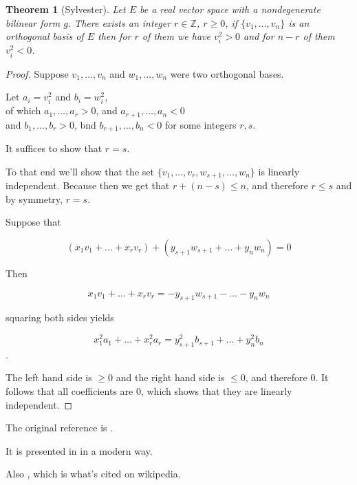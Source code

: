 \documentclass{amsbook}
\newtheorem{theorem}{Theorem}[section]   %
\theoremstyle{definition}
\theoremstyle{remark}
\newcommand{\Z}{\mathopen{}\ensuremath{\mathbb{Z}}\mathclose{}}
\begin{document}
\begin{theorem}[Sylvester]
  Let $E$ be a real vector space with a nondegenerate bilinear form $g$.
  There exists an integer $r\in \Z$, $r \geq 0$, if $\{v_1,\dots,v_n\}$ is an
  orthogonal basis of $E$ then for $r$ of them we have $v_i^2 > 0$ and for
  $n-r$ of them $v_i^2 < 0$.
\end{theorem}

\begin{proof}

  Suppose $v_1,\dots,v_n$ and $w_1,\dots,w_n$ were two orthogonal bases.

  Let $a_i = v_i^2$ and $b_i = w_i^2$,\\
  of which $a_1,\dots,a_r > 0$, and $a_{r+1},\dots,a_n < 0$ \\
  and $b_1,\dots,b_r > 0$, bnd $b_{r+1},\dots,b_n < 0$ for some integers $r,s$.

  It suffices to show that $r=s$.

  To that end we'll show that the set $\{v_1,\dots,v_r, w_{s+1},\dots, w_n\}$
  is linearly independent. Because then we get that $r + (n-s) \leq n$, and
  therefore $r \leq s$ and by symmetry, $r=s$.

  Suppose that

  \[
    (x_1 v_1 + \dots + x_r v_r) + (y_{s+1} w_{s+1} + \dots + y_n w_n) = 0
  \]

  Then

  \[
    x_1 v_1 + \dots + x_r v_r =  - y_{s+1} w_{s+1} - \dots - y_n w_n
  \]

  squaring both sides yields

  \[
    x_1^2 a_1 + \dots + x_r^2 a_r =  y_{s+1}^2 b_{s+1} + \dots + y_n^2 b_n
  \].

  The left hand side is $\geq 0$ and the right hand side is $\leq 0$, and
  therefore 0. It follows that all coefficients are 0, which shows that they
  are linearly independent.

\end{proof}


\begin{redbox}
  The original reference is \cite{Sylvester_1852}.

  It is presented in \cite[Thm.~4.1]{Lang_2002} in a modern way.

  Also \cite[Theorem 10.43]{Norman_1986}, which is what's cited on wikipedia.
\end{redbox}




\printbibliography
\end{document}

